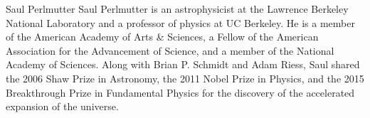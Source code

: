 \documentclass[10pt,journal,compsoc]{IEEEtran}
\begin{document}
\begin{IEEEbiography}{Saul Perlmutter}
Saul Perlmutter is an astrophysicist at the Lawrence Berkeley National Laboratory and a professor of physics at UC Berkeley. He is a member of the American Academy of Arts \& Sciences, a Fellow of the American Association for the Advancement of Science, and a member of the National Academy of Sciences. Along with Brian P. Schmidt and Adam Riess, Saul shared the 2006 Shaw Prize in Astronomy, the 2011 Nobel Prize in Physics, and the 2015 Breakthrough Prize in Fundamental Physics for the discovery of the accelerated expansion of the universe.
\end{IEEEbiography}







\end{document}

